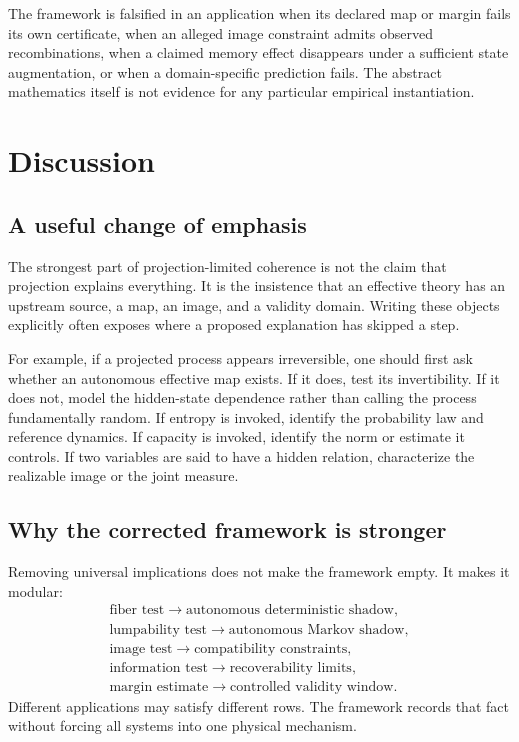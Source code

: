 \documentclass[11pt]{article}
\begin{document}
The framework is falsified in an application when its declared map or margin
fails its own certificate, when an alleged image constraint admits observed
recombinations, when a claimed memory effect disappears under a sufficient
state augmentation, or when a domain-specific prediction fails.  The
abstract mathematics itself is not evidence for any particular empirical
instantiation.

\section{Discussion}

\subsection{A useful change of emphasis}

The strongest part of projection-limited coherence is not the claim that
projection explains everything.  It is the insistence that an effective
theory has an upstream source, a map, an image, and a validity domain.
Writing these objects explicitly often exposes where a proposed explanation
has skipped a step.

For example, if a projected process appears irreversible, one should first
ask whether an autonomous effective map exists.  If it does, test its
invertibility.  If it does not, model the hidden-state dependence rather
than calling the process fundamentally random.  If entropy is invoked,
identify the probability law and reference dynamics.  If capacity is
invoked, identify the norm or estimate it controls.  If two variables are
said to have a hidden relation, characterize the realizable image or the
joint measure.

\subsection{Why the corrected framework is stronger}

Removing universal implications does not make the framework empty.  It
makes it modular:
\[
\begin{array}{c}
\text{fiber test} \longrightarrow \text{autonomous deterministic shadow},\\
\text{lumpability test} \longrightarrow \text{autonomous Markov shadow},\\
\text{image test} \longrightarrow \text{compatibility constraints},\\
\text{information test} \longrightarrow \text{recoverability limits},\\
\text{margin estimate} \longrightarrow \text{controlled validity window}.
\end{array}
\]
Different applications may satisfy different rows.  The framework records
that fact without forcing all systems into one physical mechanism.
\end{document}
